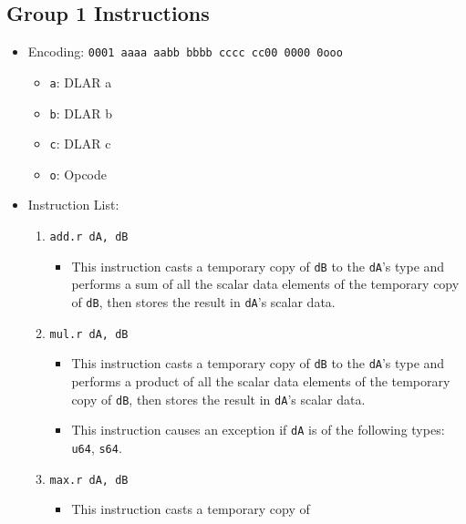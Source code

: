 \documentclass{article}
\begin{document}
	\subsection{Group 1 Instructions}
		\begin{itemize}
		\item Encoding: \texttt{0001 aaaa aabb bbbb  cccc cc00 0000 0ooo}
			\begin{itemize}
			\item \texttt{a}: DLAR a
			\item \texttt{b}: DLAR b
			\item \texttt{c}: DLAR c
			\item \texttt{o}: Opcode
			\end{itemize}
		\item Instruction List:
			\begin{enumerate}
			\item \texttt{add.r dA, dB}
				\begin{itemize}
				\item This instruction casts a temporary copy of
					\texttt{dB} to the \texttt{dA}'s type and performs a
					sum of all the scalar data elements of the temporary
					copy of \texttt{dB}, then stores the result in
					\texttt{dA}'s scalar data.
				\end{itemize}
			\item \texttt{mul.r dA, dB}
				\begin{itemize}
				\item This instruction casts a temporary copy of
					\texttt{dB} to the \texttt{dA}'s type and performs a
					product of all the scalar data elements of the
					temporary copy of \texttt{dB}, then stores the result
					in \texttt{dA}'s scalar data.
				\item This instruction causes an exception if \texttt{dA}
					is of the following types: \texttt{u64}, \texttt{s64}.
				\end{itemize}
			\item \texttt{max.r dA, dB}
				\begin{itemize}
				\item This instruction casts a temporary copy of

\end{itemize}
\end{enumerate}
\end{itemize}
\end{document}

